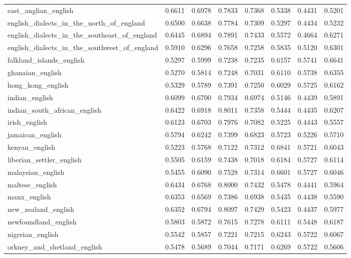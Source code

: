 \begin{landscape}
\begin{longtable}{lccccccc}
east\_anglian\_english & 0.6611 & 0.6978 & 0.7833 & 0.7368 & 0.5338 & 0.4431 & 0.5201 \\
english\_dialects\_in\_the\_north\_of\_england & 0.6500 & 0.6638 & 0.7784 & 0.7309 & 0.5297 & 0.4434 & 0.5232 \\
english\_dialects\_in\_the\_southeast\_of\_england & 0.6445 & 0.6894 & 0.7891 & 0.7433 & 0.5572 & 0.4664 & 0.6271 \\
english\_dialects\_in\_the\_southwest\_of\_england & 0.5910 & 0.6296 & 0.7658 & 0.7258 & 0.5835 & 0.5120 & 0.6301 \\
falkland\_islands\_english & 0.5297 & 0.5999 & 0.7238 & 0.7235 & 0.6157 & 0.5741 & 0.6641 \\
ghanaian\_english & 0.5270 & 0.5814 & 0.7248 & 0.7031 & 0.6110 & 0.5738 & 0.6355 \\
hong\_kong\_english & 0.5329 & 0.5789 & 0.7391 & 0.7250 & 0.6029 & 0.5725 & 0.6162 \\
indian\_english & 0.6099 & 0.6700 & 0.7934 & 0.6974 & 0.5146 & 0.4439 & 0.5891 \\
indian\_south\_african\_english & 0.6422 & 0.6918 & 0.8011 & 0.7358 & 0.5444 & 0.4435 & 0.6207 \\
irish\_english & 0.6123 & 0.6703 & 0.7976 & 0.7082 & 0.5225 & 0.4443 & 0.5557 \\
jamaican\_english & 0.5794 & 0.6242 & 0.7399 & 0.6823 & 0.5723 & 0.5226 & 0.5710 \\
kenyan\_english & 0.5223 & 0.5768 & 0.7122 & 0.7312 & 0.6841 & 0.5721 & 0.6043 \\
liberian\_settler\_english & 0.5505 & 0.6159 & 0.7438 & 0.7018 & 0.6184 & 0.5727 & 0.6114 \\
malaysian\_english & 0.5455 & 0.6090 & 0.7528 & 0.7314 & 0.6601 & 0.5727 & 0.6046 \\
maltese\_english & 0.6434 & 0.6768 & 0.8000 & 0.7432 & 0.5478 & 0.4441 & 0.5964 \\
manx\_english & 0.6353 & 0.6569 & 0.7386 & 0.6938 & 0.5435 & 0.4438 & 0.5590 \\
new\_zealand\_english & 0.6352 & 0.6794 & 0.8097 & 0.7429 & 0.5423 & 0.4437 & 0.5977 \\
newfoundland\_english & 0.5803 & 0.5872 & 0.7615 & 0.7278 & 0.6111 & 0.5448 & 0.6187 \\
nigerian\_english & 0.5542 & 0.5857 & 0.7221 & 0.7215 & 0.6243 & 0.5722 & 0.6067 \\
orkney\_and\_shetland\_english & 0.5478 & 0.5689 & 0.7044 & 0.7171 & 0.6269 & 0.5722 & 0.5606 \\

\end{longtable}
\end{landscape}
